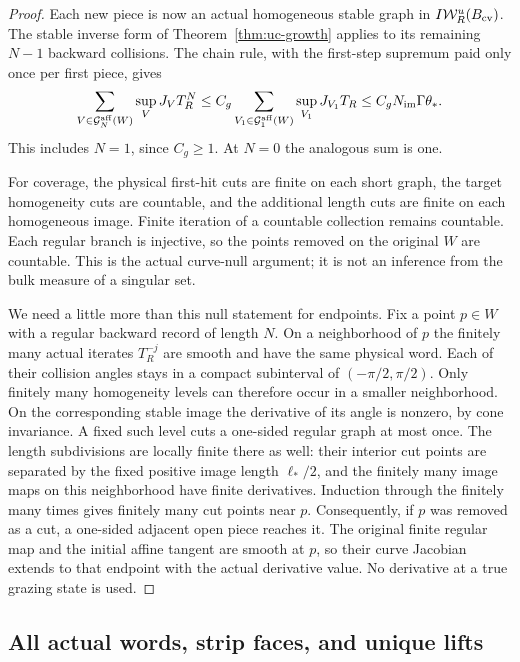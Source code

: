 \begin{proof}
Each new piece is now an actual homogeneous stable graph in
$I\mathcal W_R^u(B_{\rm cv})$.  The stable inverse form of
Theorem~\ref{thm:uc-growth} applies to its remaining $N-1$
backward collisions.  The chain rule, with the first-step supremum
paid only once per first piece, gives
\[
 \sum_{V\in\mathcal G_N^{\rm aff}(W)}\sup_V J_VT_R^N
 \le C_g\sum_{V_1\in\mathcal G_1^{\rm aff}(W)}
                                  \sup_{V_1}J_{V_1}T_R
 \le C_gN_{\rm im}\Gamma\theta_*.
\]
This includes $N=1$, since $C_g\ge1$.  At $N=0$ the analogous
sum is one.

For coverage, the physical first-hit cuts are finite on each short
graph, the target homogeneity cuts are countable, and the additional
length cuts are finite on each homogeneous image.  Finite iteration
of a countable collection remains countable.  Each regular branch
is injective, so the points removed on the original $W$ are countable.
This is the actual curve-null argument; it is not an inference from
the bulk measure of a singular set.

We need a little more than this null statement for endpoints.  Fix
a point $p\in W$ with a regular backward record of length $N$.
On a neighborhood of $p$ the finitely many actual iterates
$T_R^{-j}$ are smooth and have the same physical word.  Each of
their collision angles stays in a compact subinterval of
$(-\pi/2,\pi/2)$.  Only finitely many homogeneity levels can
therefore occur in a smaller neighborhood.  On the corresponding
stable image the derivative of its angle is nonzero, by cone
invariance.  A fixed such level cuts a one-sided regular graph at
most once.  The length subdivisions are locally finite there as
well: their interior cut points are separated by the fixed positive
image length $\ell_*/2$, and the finitely many image maps on this
neighborhood have finite derivatives.  Induction through the
finitely many times gives finitely many cut points near $p$.
Consequently, if $p$ was removed as a cut, a one-sided adjacent
open piece reaches it.  The original finite regular map and the
initial affine tangent are smooth at $p$, so their curve Jacobian
extends to that endpoint with the actual derivative value.  No
derivative at a true grazing state is used.
\end{proof}

\subsection{All actual words, strip faces, and unique lifts}

